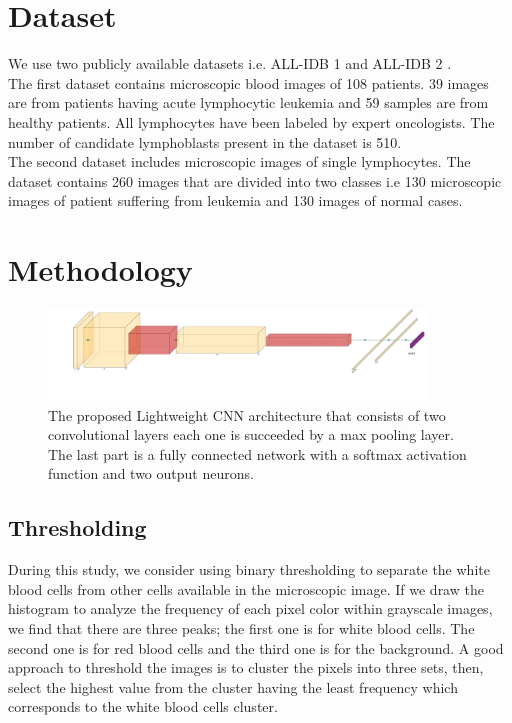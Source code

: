 \documentclass[diagnostics,article,submit,pdftex,moreauthors]{Definitions/mdpi}
\begin{document}
\section{Dataset}
We use two publicly available datasets i.e. ALL-IDB 1 and ALL-IDB 2 \cite{labati2011all}.\\
The first dataset contains microscopic blood images of 108 patients. 39 images are from patients having acute lymphocytic leukemia and 59 samples are from healthy patients. All lymphocytes have been labeled by expert oncologists. The number of candidate lymphoblasts present in the dataset is 510.\\
The second dataset includes microscopic images of single lymphocytes. The dataset contains 260 images that are divided into two classes i.e 130 microscopic images of patient suffering from leukemia and 130 images of normal cases. 


\section{Methodology}
\begin{figure}[htp]
  \centering
  \includegraphics[width=10cm]{images/graph.pdf}
  \caption{The proposed Lightweight CNN architecture that consists of two convolutional layers each one is succeeded by a max pooling layer. The last part is a fully connected network with a softmax activation function and two output neurons.}
\end{figure}
\subsection{Thresholding}
During this study, we consider using binary thresholding to separate the white blood cells from other cells available in the microscopic image. If we draw the histogram to analyze the frequency of each pixel color within grayscale images, we find that there are three peaks; the first one is for white blood cells. The second one is for red blood cells and the third one is for the background. A good approach to threshold the images is to cluster the pixels into three sets, then, select the highest value from the cluster having the least frequency which corresponds to the white blood cells cluster.
\end{document}
